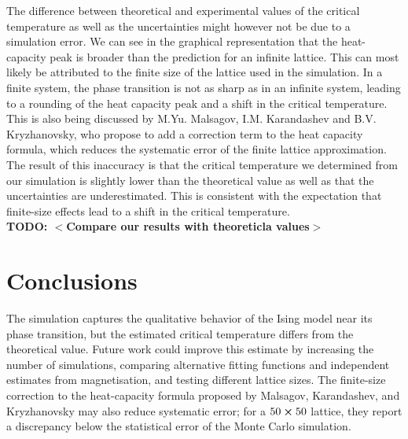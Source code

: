 \documentclass[twocolumn,a4paper,aps,amsmath,amssymb,floatfix,superscriptaddress]{revtex4-2}
\newcommand{\todo}[1]{
    \textbf{TODO: $<$#1$>$}
}
\begin{document}
    The difference between theoretical and experimental values of the critical temperature as well as the uncertainties might however not be due to a simulation error. We can see in the graphical representation that the heat-capacity peak is broader than the prediction for an infinite lattice. This can most likely be attributed to the finite size of the lattice used in the simulation. In a finite system, the phase transition is not as sharp as in an infinite system, leading to a rounding of the heat capacity peak and a shift in the critical temperature. This is also being discussed by M.Yu. Malsagov, I.M. Karandashev and B.V. Kryzhanovsky\cite{Malsagov2017}, who propose to add a correction term to the heat capacity formula, which reduces the systematic error of the finite lattice approximation. The result of this inaccuracy is that the critical temperature we determined from our simulation is slightly lower than the theoretical value as well as that the uncertainties are underestimated. This is consistent with the expectation that finite-size effects lead to a shift in the critical temperature.\\
     
    \todo{Compare our results with theoreticla values}

\section{Conclusions}\label{conclusions}
    The simulation captures the qualitative behavior of the Ising model near its phase transition, but the estimated critical temperature differs from the theoretical value. Future work could improve this estimate by increasing the number of simulations, comparing alternative fitting functions and independent estimates from magnetisation, and testing different lattice sizes. The finite-size correction to the heat-capacity formula proposed by Malsagov, Karandashev, and Kryzhanovsky may also reduce systematic error; for a $50 \cross 50$ lattice, they report a discrepancy below the statistical error of the Monte Carlo simulation\cite{Malsagov2017}.




\end{document}
